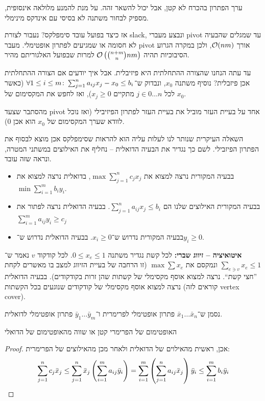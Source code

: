 \documentclass[]{../../../../tex/classes/styledArticle}
\begin{document}
	ערך הפתרון בהכרח לא קטן, אבל יכול להשאר זהה. על מנת להמנע מלולאה אינסופית, מספיק לבחור משתנה לא בסיסי עם אינדקס מינימלי. 
	
	אז כיצד בפועל עובד סימפלקס? נעבור לצורת slack, ונבצע מעברי pivot עד שמגלים שהבעיה לא חסומה או שמגיעים לפתרון אופטימלי. מעבר pivot אורך $\mathcal{O}(nm)$, ולכן במקרה הגרוע הסיבוכיות תהיה $\mathcal{O}\left ( \binom{n + m}{n}nm \right )$ למרות שבפועל האלגוריתם מהיר. 
	
	עד עתה הנחנו שהצורה ההתחלתית היא פיזיבלית. אבל איך יודעים אם הצורה ההתחלתית אכן פיזבלית? נוסיף משתנה $x_0$, ונבדוק ש־$\forall 1 \le i \le m \colon \sum_{j = 1}^{n}a_{ij}x_j - x_0 \le b_i$ (כאשר לכל $j \in 0 \dots n$ מתקיים $x_j \ge 0$), ואז לחפש את המקסימום של $x_0$. 
	
	
	\prooftrivial
	
	מהסתבר שצעד pivot אחד על בעיית העזר מוביל את בעיית העזר לפתרון הפיזיבילי (ואז נוכל לוודא שערך המקסימום של $x_0$ הוא אכן $0$). 
	
	השאלה העיקרית שנותר לנו לעלות עליה הוא להראות שסימפלקס אכן מוצא לבסוף את הפתרון הפיזבילי. לשם כך נגדיר את הבעיה הדואלית – נחליף את האילוצים במשתני המטרה, ונראה שזה עובד. 
	
	\begin{itemize}
		\item בבעיה המקורית נרצה למצוא את $\max \sum_{j = 1}^{n}c_j x_j$, בדואלית נרצה למצוא את $\min \sum_{i = 1}^{m}b_i y_i$. 
		\item בבעיה המקורית האילוצים שלנו הם $\sum_{j = 1}^{n}a_{ij}x_j \le b_i$. בבעיה הדואלית נרצה לפתור את $\sum_{i = 1}^{m}a_{ij}y_i \ge c_j$
		\item בבעיה המקורית נדרוש ש־$x_i \ge 0$. בבעיה הדואלית נדרוש ש־$y_i \ge 0$. 
	\end{itemize}
	
	\textbf{איטואיציה – זיווג שברי: }לכל קשת נגדיר משתנה $0 \le x_e \le 1$. לכל קודקוד $v$ נאמר ש־$\sum_{e \ni v}x_e \le 1$ ונמקסם את $\max \sum x_e$ (זו הרחבה של בעיית הזיווג למצב בו מאשרים לקחת ''חצי קשת``. נרצה למצוא אוסף מקסימלי של קשתות שהן זרות בקודקודים). בבעיה הדואלית נרצה למצוא אוסף מקסימלי של קודקודים שנוגעים בכל הקשתות (קוראים לזה vertex cover). 
	
	
	נסמן ש־$\bar x_1 \dots \bar x_n$ פתרון אופטימלי לפרימרית ו־$\bar y_1 \dots \bar y_m$ פתרון אופטימלי לדואלית. 
	\begin{Theorem}
		האופטימום של הפרימרי קטן או שווה מהאופטימום של הדואלי
	\end{Theorem}
	\begin{proof}
		אכן, ראשית מהאילוים של הדואלית ולאחר מכן מהאילוצים של הפרימרית: 
		\[ \sum_{j = 1}^{n} c_j \bar x_j \le \sum^{n}_{j = 1} \bar x_j \left ( \sum^{m}_{i = 1} a_{ij}\bar y_i \right ) = \sum_{i = 1}^{m}\left ( \sum_{j = 1}^{n}a_{ij}\bar x_j \right )\bar y_i \le \sum_{i = 1}^{m}b_i\bar y_i  \]
	\end{proof}
	
\end{document}
